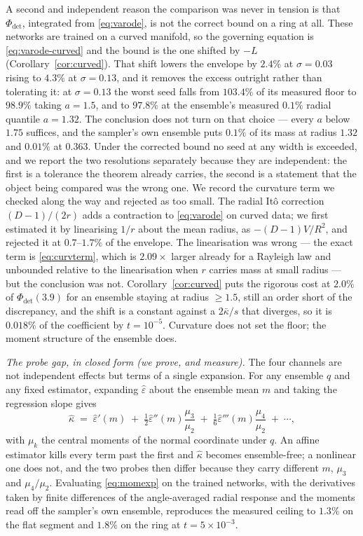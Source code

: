 \documentclass[11pt]{article}
\theoremstyle{remark}
\newcommand{\kb}{\bar\kappa}
\newcommand{\epshat}{\hat\varepsilon}
\begin{document}
A second and independent reason the comparison was never in tension is that
$\Phi_{\det}$, integrated from \eqref{eq:varode}, is not the correct bound on a ring at
all. These networks are trained on a curved manifold, so the governing equation is
\eqref{eq:varode-curved} and the bound is the one shifted by $-L$
(Corollary~\ref{cor:curved}). That shift lowers the envelope by $2.4\%$ at $\sigma=0.03$
rising to $4.3\%$ at $\sigma=0.13$, and it removes the excess outright rather than
tolerating it: at $\sigma=0.13$ the worst seed falls from $103.4\%$ of its measured floor
to $98.9\%$ taking $a=1.5$, and to $97.8\%$ at the ensemble's measured $0.1\%$ radial
quantile $a=1.32$. The conclusion does not turn on that choice --- every $a$ below $1.75$
suffices, and the sampler's own ensemble puts $0.1\%$ of its mass at radius $1.32$ and
$0.01\%$ at $0.363$. Under the corrected bound no seed at any width is exceeded, and we
report the two resolutions separately because they are independent: the first is a
tolerance the theorem already carries, the second is a statement that the object being
compared was the wrong one. We record the curvature term we checked
along the way and rejected as too small. The radial It\^o correction $(D-1)/(2r)$ adds a
contraction to \eqref{eq:varode} on curved data; we first estimated it by linearising
$1/r$ about the mean radius, as $-(D-1)V/R^2$, and rejected it at $0.7$--$1.7\%$ of the
envelope. The linearisation was wrong --- the exact term is \eqref{eq:curvterm}, which is
$2.09\times$ larger already for a Rayleigh law and unbounded relative to the linearisation
when $r$ carries mass at small radius --- but the conclusion was not. Corollary~\ref{cor:curved}
puts the rigorous cost at $2.0\%$ of $\Phi_{\det}(3.9)$ for an ensemble staying at radius
$\ge1.5$, still an order short of the discrepancy, and the shift is a constant against a
$2\kb/s$ that diverges, so it is $0.018\%$ of the coefficient by $t=10^{-5}$. Curvature
does not set the floor; the moment structure of the ensemble does.

\emph{The probe gap, in closed form (\emph{we prove, and measure}).} The four channels are
not independent effects but terms of a single expansion. For any ensemble $q$ and any fixed
estimator, expanding $\epshat$ about the ensemble mean $m$ and taking the regression slope
gives
\begin{equation}
\hat\kappa \;=\; \epshat'(m)\;+\;\tfrac12\epshat''(m)\frac{\mu_3}{\mu_2}
\;+\;\tfrac16\epshat'''(m)\frac{\mu_4}{\mu_2}\;+\;\cdots,
\label{eq:momexp}
\end{equation}
with $\mu_k$ the central moments of the normal coordinate under $q$. An affine estimator
kills every term past the first and $\hat\kappa$ becomes ensemble-free; a nonlinear one does
not, and the two probes then differ because they carry different $m$, $\mu_3$ and
$\mu_4/\mu_2$. Evaluating \eqref{eq:momexp} on the trained networks, with the derivatives
taken by finite differences of the angle-averaged radial response and the moments read off
the sampler's own ensemble, reproduces the measured ceiling to $1.3\%$ on the flat segment
and $1.8\%$ on the ring at $t=5\times10^{-3}$.
\end{document}
